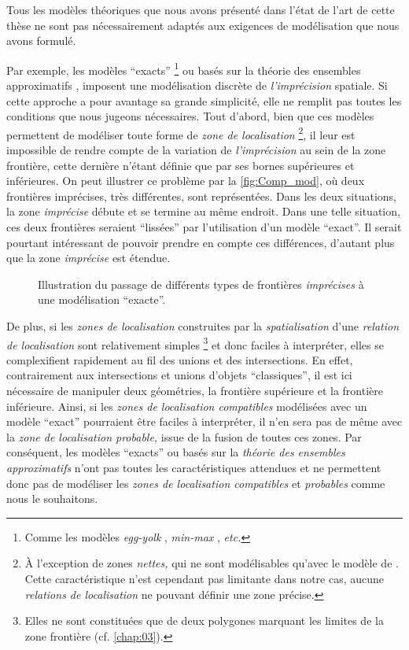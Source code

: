 Tous les modèles théoriques que nous avons présenté dans l'état de
l'art de cette thèse ne sont pas nécessairement adaptés aux exigences
de modélisation que nous avons formulé.

Par exemple, les modèles \enquote{exacts} \footnote{Comme les modèles
  \emph{egg-yolk} \autocite{Cohn1996}, \emph{min-max}
  \autocite{Clementini1996}, \emph{etc.}} ou basés sur la théorie des
ensembles approximatifs \autocite{Pawlak1982}, imposent une
modélisation discrète de \emph{l'imprécision} spatiale. Si cette
approche a pour avantage sa grande simplicité, elle ne remplit pas
toutes les conditions que nous jugeons nécessaires. Tout d'abord, bien
que ces modèles permettent de modéliser toute forme de \emph{zone de
  localisation} \footnote{À l'exception de zones \emph{nettes,} qui ne
  sont modélisables qu'avec le modèle de \textcite{Bejaoui2009}. Cette
  caractéristique n'est cependant pas limitante dans notre cas, aucune
  \emph{relations de localisation} ne pouvant définir une zone
  précise.}, il leur est impossible de rendre compte de la variation
de \emph{l'imprécision} au sein de la zone frontière, cette dernière
n'étant définie que par ses bornes supérieures et inférieures. On peut
illustrer ce problème par la \autoref{fig:Comp_mod}, où deux
frontières imprécises, très différentes, sont représentées. Dans les
deux situations, la zone \emph{imprécise} débute et se termine au même
endroit. Dans une telle situation, ces deux frontières seraient
\enquote{lissées} par l'utilisation d'un modèle \enquote{exact}. Il
serait pourtant intéressant de pouvoir prendre en compte ces
différences, d'autant plus que la zone \emph{imprécise} est étendue.

\begin{figure}
  \centering
  
  \caption{Illustration du passage de différents types de frontières
    \emph{imprécises} à une modélisation \enquote{exacte}.}
  \label{fig:Comp_mod}
\end{figure}

De plus, si les \emph{zones de localisation} construites par la
\emph{spatialisation} d'une \emph{relation de localisation} sont
relativement simples \footnote{Elles ne sont constituées que de deux
  polygones marquant les limites de la zone frontière
  (cf. \autoref{chap:03}).} et donc faciles à interpréter, elles se
complexifient rapidement au fil des unions et des intersections. En
effet, contrairement aux intersections et unions d'objets
\enquote{classiques}, il est ici nécessaire de manipuler deux
géométries, la frontière supérieure et la frontière inférieure. Ainsi,
si les \emph{zones de localisation compatibles} modélisées avec un
modèle \enquote{exact} pourraient être faciles à interpréter, il n'en
sera pas de même avec la \emph{zone de localisation probable,} issue
de la fusion de toutes ces zones. Par conséquent, les modèles
\enquote{exacts} ou basés sur la \emph{théorie des ensembles
  approximatifs} n'ont pas toutes les caractéristiques attendues et ne
permettent donc pas de modéliser les \emph{zones de localisation
  compatibles} et \emph{probables} comme nous le souhaitons.

